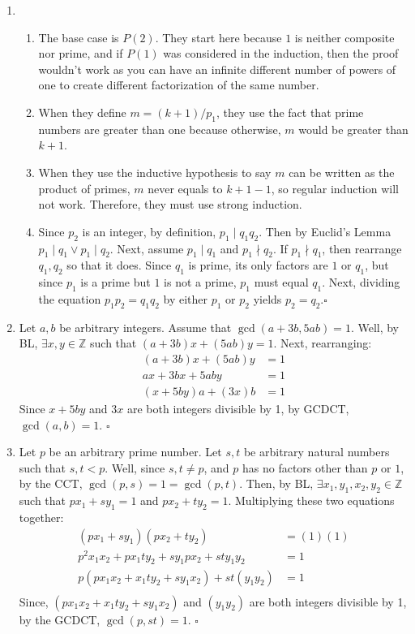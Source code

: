 \documentclass[10pt]{article}
\begin{document}
\begin{enumerate}
    \item 
    \begin{enumerate}
        \item The base case is $P(2)$. They start here because $1$ is neither composite nor prime, and if $P(1)$ was considered in the induction, then the proof wouldn't work as you can have an infinite different number of powers of one to create different factorization of the same number.
        \item
        When they define $m = (k+1)/p_1$, they use the fact that prime numbers are greater than one because otherwise, $m$ would be greater than $k+1$.
        \item
        When they use the inductive hypothesis to say $m$ can be written as the product of primes, $m$ never equals to $k+1-1$, so regular induction will not work. Therefore, they must use strong induction.
        \item
        Since $p_2$ is an integer, by definition, $p_1 \mid q_1q_2$. Then by Euclid's Lemma $p_1 \mid q_1 \vee p_1 \mid q_2$. Next, assume $p_1 \mid q_1$ and $p_1 \nmid q_2$. If $p_1 \nmid q_1$, then rearrange $q_1, q_2$ so that it does. Since $q_1$ is prime, its only factors are $1$ or $q_1$, but since $p_1$ is a prime but $1$ is not a prime, $p_1$ must equal $q_1$. Next, dividing the equation $p_1p_2 = q_1q_2$ by either $p_1$ or $p_2$ yields $p_2 = q_2. \square$
    \end{enumerate}
    \item
    Let $a,b$ be arbitrary integers. Assume that $\gcd{(a + 3b, 5ab)} = 1$. 
    Well, by BL, $\exists x,y \in \mathbb{Z}$ such that $(a+3b)x + (5ab)y = 1$. Next, rearranging: 
    \begin{align*}
        (a + 3b)x + (5ab)y &= 1\\
        ax + 3bx + 5aby &= 1\\
        (x+5by)a + (3x)b &=1
    \end{align*}
    Since $x+5by$ and $3x$ are both integers divisible by 1, by GCDCT, $\gcd{(a,b)} = 1$. $\square$
    
    \item
    Let $p$ be an arbitrary prime number. Let $s,t$ be arbitrary natural numbers such that $s,t < p$. Well, since $s,t \neq p$, and $p$ has no factors other than $p$ or $1$, by the CCT, $\gcd{(p,s)} = 1 = \gcd{(p,t)}$. Then, by BL, $\exists x_1,y_1,x_2,y_2 \in \mathbb{Z}$ such that $px_1 + sy_1 = 1$ and $px_2 + ty_2 = 1$. Multiplying these two equations together: 
    \begin{align*}
        (px_1 + sy_1)(px_2 + ty_2) &= (1)(1) \\
        p^2x_1x_2 + px_1ty_2 + sy_1px_2+sty_1y_2 &= 1\\
        p(px_1x_2 + x_1ty_2 + sy_1x_2) + st(y_1y_2) &= 1 \\
    \end{align*}
    Since, $(px_1x_2 + x_1ty_2 + sy_1x_2)$ and $(y_1y_2)$ are both integers divisible by 1, by the GCDCT, $\gcd{(p, st)} = 1$.  $\square$


\end{enumerate}
\end{document}

